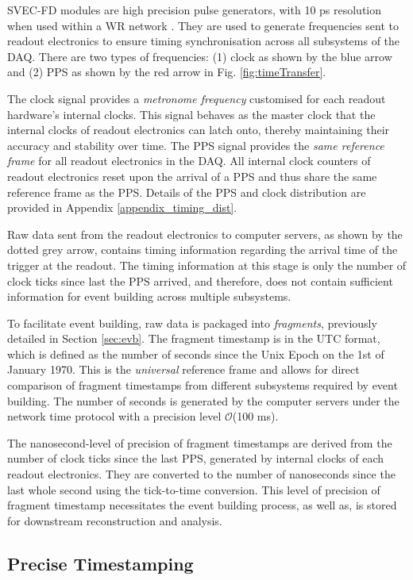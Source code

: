 SVEC-FD modules are high precision pulse generators, with 10 ps resolution when used within a WR network \cite{WR_paper}.
They are used to generate frequencies sent to readout electronics to ensure timing synchronisation across all subsystems of the DAQ.
There are two types of frequencies: (1) clock as shown by the blue arrow and (2) PPS as shown by the red arrow in Fig. \ref{fig:timeTransfer}.

The clock signal provides a \textit{metronome frequency} customised for each readout hardware's internal clocks.
This signal behaves as the master clock that the internal clocks of readout electronics can latch onto, thereby maintaining their accuracy and stability over time.
The PPS signal provides the \textit{same reference frame} for all readout electronics in the DAQ.
All internal clock counters of readout electronics reset upon the arrival of a PPS and thus share the same reference frame as the PPS.
Details of the PPS and clock distribution are provided in Appendix \ref{appendix_timing_dist}.

Raw data sent from the readout electronics to computer servers, as shown by the dotted grey arrow, contains timing information regarding the arrival time of the trigger at the readout.
The timing information at this stage is only the number of clock ticks since last the PPS arrived, and therefore, does not contain sufficient information for event building across multiple subsystems.

To facilitate event building, raw data is packaged into \textit{fragments}, previously detailed in Section \ref{sec:evb}.
The fragment timestamp is in the UTC format, which is defined as the number of seconds since the Unix Epoch on the 1st of January 1970.
This is the \textit{universal} reference frame and allows for direct comparison of fragment timestamps from different subsystems required by event building.
The number of seconds is generated by the computer servers under the network time protocol with a precision level $\mathcal{O}$(100 ms).

The nanosecond-level of precision of fragment timestamps are derived from the number of clock ticks since the last PPS, generated by internal clocks of each readout electronics.
They are converted to the number of nanoseconds since the last whole second using the tick-to-time conversion.
This level of precision of fragment timestamp necessitates the event building process, as well as, is stored for downstream reconstruction and analysis.

\subsection{Precise Timestamping}
\label{subsec42TimeRef}

